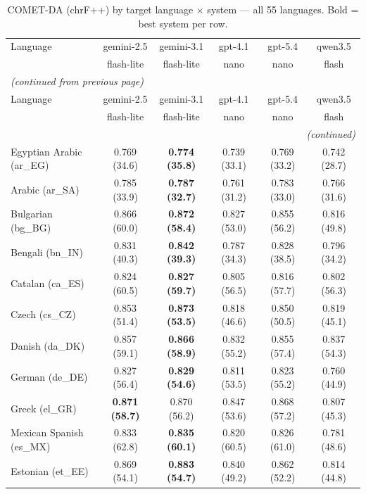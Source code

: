 \begingroup
\scriptsize
\setlength{\tabcolsep}{2pt}
\begin{longtable}{@{}lccccc@{}}
    \caption{COMET-DA (chrF++) by target language $\times$ system --- all 55
    languages. Bold = best system per row.}
    \label{tab:appendix-comet-full} \\
    \toprule
    Language & gemini-2.5 & gemini-3.1 & gpt-4.1 & gpt-5.4 & qwen3.5 \\
     & flash-lite & flash-lite & nano & nano & flash \\
    \midrule
    \endfirsthead
    \multicolumn{6}{l}{\textit{(continued from previous page)}} \\
    \toprule
    Language & gemini-2.5 & gemini-3.1 & gpt-4.1 & gpt-5.4 & qwen3.5 \\
     & flash-lite & flash-lite & nano & nano & flash \\
    \midrule
    \endhead
    \midrule
    \multicolumn{6}{r}{\textit{(continued)}} \\
    \endfoot
    \bottomrule
    \endlastfoot
    Egyptian Arabic (ar\_EG) & 0.769 (34.6) & \textbf{0.774 (35.8)} & 0.739 (33.1) & 0.769 (33.2) & 0.742 (28.7) \\
    Arabic (ar\_SA) & 0.785 (33.9) & \textbf{0.787 (32.7)} & 0.761 (31.2) & 0.783 (33.0) & 0.766 (31.6) \\
    Bulgarian (bg\_BG) & 0.866 (60.0) & \textbf{0.872 (58.4)} & 0.827 (53.0) & 0.855 (56.2) & 0.816 (49.8) \\
    Bengali (bn\_IN) & 0.831 (40.3) & \textbf{0.842 (39.3)} & 0.787 (34.3) & 0.828 (38.5) & 0.796 (34.2) \\
    Catalan (ca\_ES) & 0.824 (60.5) & \textbf{0.827 (59.7)} & 0.805 (56.5) & 0.816 (57.7) & 0.802 (56.3) \\
    Czech (cs\_CZ) & 0.853 (51.4) & \textbf{0.873 (53.5)} & 0.818 (46.6) & 0.850 (50.5) & 0.819 (45.1) \\
    Danish (da\_DK) & 0.857 (59.1) & \textbf{0.866 (58.9)} & 0.832 (55.2) & 0.855 (57.4) & 0.837 (54.3) \\
    German (de\_DE) & 0.827 (56.4) & \textbf{0.829 (54.6)} & 0.811 (53.5) & 0.823 (55.2) & 0.760 (44.9) \\
    Greek (el\_GR) & \textbf{0.871 (58.7)} & 0.870 (56.2) & 0.847 (53.6) & 0.868 (57.2) & 0.807 (45.3) \\
    Mexican Spanish (es\_MX) & 0.833 (62.8) & \textbf{0.835 (60.1)} & 0.820 (60.5) & 0.826 (61.0) & 0.781 (48.6) \\
    Estonian (et\_EE) & 0.869 (54.1) & \textbf{0.883 (54.7)} & 0.840 (49.2) & 0.862 (52.2) & 0.814 (44.8) \\

\end{longtable}

